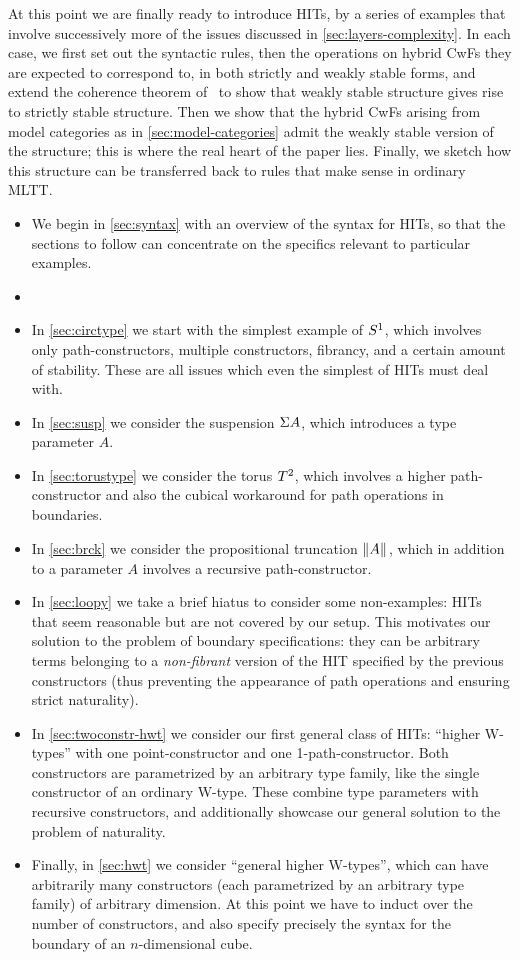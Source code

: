 \documentclass{amsart}
\begin{document}
At this point we are finally ready to introduce HITs, by a series of examples that involve successively more of the issues discussed in \cref{sec:layers-complexity}.
In each case, we first set out the syntactic rules, then the operations on hybrid CwFs they are expected to correspond to, in both strictly and weakly stable forms, and extend the coherence theorem of~\cite{lw:localuniv} to show that weakly stable structure gives rise to strictly stable structure.
Then we show that the hybrid CwFs arising from model categories as in \cref{sec:model-categories} admit the weakly stable version of the structure; this is where the real heart of the paper lies.
Finally, we sketch how this structure can be transferred back to rules that make sense in ordinary MLTT.
\begin{itemize}
\item We begin in \cref{sec:syntax} with an overview of the syntax for HITs, so that the sections to follow can concentrate on the specifics relevant to particular examples.
\item {}
\item In \cref{sec:circtype} we start with the simplest example of $S^1$, which involves only path-constructors, multiple constructors, fibrancy, and a certain amount of stability.
  These are all issues which even the simplest of HITs must deal with.
\item In \cref{sec:susp} we consider the suspension $\Sigma A$, which introduces a type parameter $A$.
\item In \cref{sec:torustype} we consider the torus $T^2$, which involves a higher path-constructor and also the cubical workaround for path operations in boundaries.
\item In \cref{sec:brck} we consider the propositional truncation $\mathopen{}\left\Vert A\right\Vert_{}\mathclose{}$, which in addition to a parameter $A$ involves a recursive path-constructor.
\item In \cref{sec:loopy} we take a brief hiatus to consider some non-examples: HITs that seem reasonable but are not covered by our setup.
  This motivates our solution to the problem of boundary specifications: they can be arbitrary terms belonging to a \emph{non-fibrant} version of the HIT specified by the previous constructors (thus preventing the appearance of path operations and ensuring strict naturality).
\item In \cref{sec:twoconstr-hwt} we consider our first general class of HITs: ``higher W-types'' with one point-constructor and one 1-path-constructor.
  Both constructors are parametrized by an arbitrary type family, like the single constructor of an ordinary W-type.
  These combine type parameters with recursive constructors, and additionally showcase our general solution to the problem of naturality.
\item Finally, in \cref{sec:hwt} we consider ``general higher W-types'', which can have arbitrarily many constructors (each parametrized by an arbitrary type family) of arbitrary dimension.
  At this point we have to induct over the number of constructors, and also specify precisely the syntax for the boundary of an $n$-dimensional cube.
\end{itemize}
\end{document}
